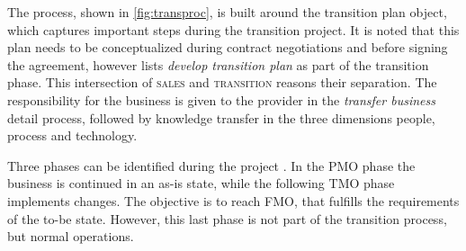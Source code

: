 	The process, shown in \Fig \ref{fig:transproc}, is built around the transition plan object, which captures important steps during the transition project. It is noted that this plan needs to be conceptualized during contract negotiations and before signing the agreement, however \cite{deloittehandbook} lists \textit{develop transition plan} as part of the transition phase. This intersection of \textsc{sales} and \textsc{transition} reasons their separation. The responsibility for the business is given to the provider in the \textit{transfer business} detail process, followed by knowledge transfer in the three dimensions people, process and technology. 
	
	Three phases can be identified during the project \citep{bitkom2008, 0273705601}. In the \acrfull{PMO} phase the business is continued in an as-is state, while the following  \acrfull{TMO} phase implements changes. The objective is to reach \acrfull{FMO}, that fulfills the requirements of the to-be state. However, this last phase is not part of the transition process, but normal operations. 
	
